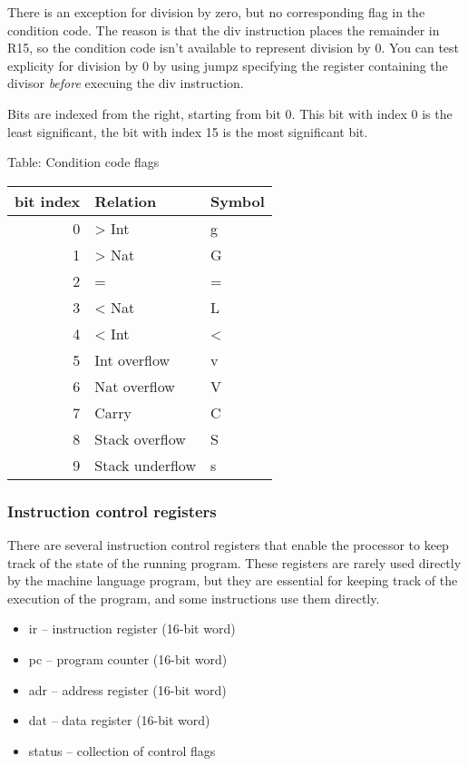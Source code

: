 \documentclass[11pt]{article}
\begin{document}
\begin{itemize}
There is an exception for division by zero, but no corresponding flag
in the condition code.  The reason is that the div instruction places
the remainder in R15, so the condition code isn't available to
represent division by 0.  You can test explicity for division by 0 by
using jumpz specifying the register containing the divisor \emph{before}
execuing the div instruction.

Bits are indexed from the right, starting from bit 0.  This bit with
index 0 is the least significant, the bit with index 15 is the most
significant bit.

Table: Condition code flags

\begin{center}
\begin{tabular}{rll}
bit index & Relation & Symbol\\
\hline
0 & > Int & g\\
1 & > Nat & G\\
2 & = & =\\
3 & < Nat & L\\
4 & < Int & <\\
5 & Int overflow & v\\
6 & Nat overflow & V\\
7 & Carry & C\\
8 & Stack overflow & S\\
9 & Stack underflow & s\\
\end{tabular}
\end{center}
\end{itemize}

\subsubsection*{Instruction control registers}
\label{sec:orgec0089c}
There are several instruction control registers that enable the
processor to keep track of the state of the running program.  These
registers are rarely used directly by the machine language program,
but they are essential for keeping track of the execution of the
program, and some instructions use them directly.

\begin{itemize}
\item ir -- instruction register (16-bit word)

\item pc -- program counter (16-bit word)

\item adr -- address register (16-bit word)

\item dat -- data register (16-bit word)

\item status -- collection of control flags
\end{itemize}
\end{document}
